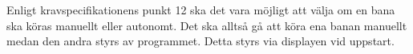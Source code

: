 Enligt kravspecifikationens punkt 12 ska det vara möjligt att välja om en bana ska köras manuellt eller autonomt. Det ska alltså gå att köra ena banan manuellt medan den andra styrs av programmet. Detta styrs via displayen vid uppstart.

